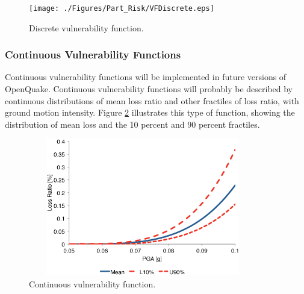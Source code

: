 \begin{figure}[ht]
\centering
\texttt{[image: ./Figures/Part\_Risk/VFDiscrete.eps]}
\caption{Discrete vulnerability function.}
\label{fig:VFDiscrete}
\end{figure}

\subsubsection{Continuous Vulnerability Functions}
Continuous vulnerability functions will be implemented in future versions of OpenQuake. Continuous vulnerability functions will probably be described by continuous distributions of mean loss ratio and other fractiles of loss ratio, with ground motion intensity. Figure \ref{fig:VFContinuous} illustrates this type of function, showing the distribution of mean loss and the 10 percent and 90 percent fractiles.

\begin{figure}[ht]
\centering
\includegraphics[width=10cm,height=6cm]{./Figures/Part_Risk/VFContinuous}
\caption{Continuous vulnerability function.}
\label{fig:VFContinuous}
\end{figure}

